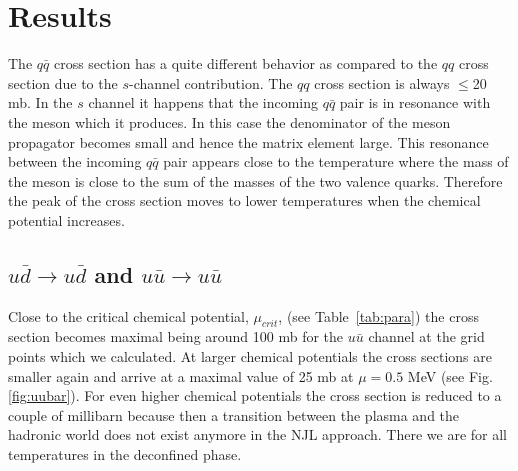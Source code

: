 \documentclass[a4paper]{jpconf}
\begin{document}
\section{Results}
The $q\bar q$ cross section has a quite different behavior as compared to the $qq$ cross section due to the $s$-channel contribution. The $qq$ cross section is always $\le $20 mb. In the $s$ channel it happens that
the incoming $q\bar q$ pair is in resonance with the meson which it produces. In this case the denominator of the meson propagator becomes  small  and hence the matrix element large. This resonance between the
incoming $q\bar q$ pair appears close to the temperature where the mass of the meson is close to the sum of the masses of the two valence quarks. Therefore the peak of the cross section moves to lower
temperatures when the chemical potential increases. 

\subsection{$u\bar{d} \rightarrow u\bar{d}$ and $u\bar{u} \rightarrow u\bar{u}$ }
Close to  the critical chemical potential, $\mu_{crit}$, (see Table~\ref{tab:para}) the cross section becomes maximal being around 100  mb for the $u \bar u$ channel at the grid points which we calculated. At larger
chemical potentials the cross sections are smaller again and arrive at a maximal value of 25 mb at $\mu = 0.5$ MeV (see Fig.\ref{fig:uubar}). For even higher chemical potentials the cross section is reduced to a couple of millibarn
 because then a transition between the plasma and the hadronic world does not exist anymore in the NJL approach. There we are for all temperatures in the deconfined phase.    
\end{document}
